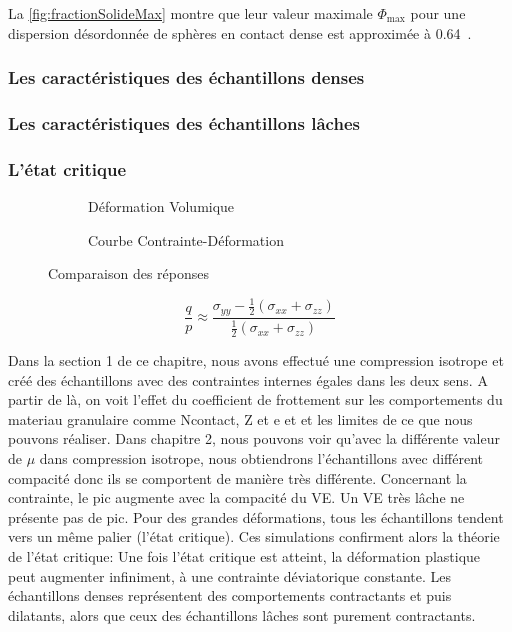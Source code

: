 \documentclass[a4paper,12pt]{report}
\begin{document}
La \autoref{fig:fractionSolideMax} montre que leur valeur maximale $\Phi_{\max}$ pour une dispersion désordonnée de sphères en contact dense est approximée à 0.64~\cite{combe2023demlecture}.
\subsubsection{Les caractéristiques des échantillons denses}
\subsubsection{Les caractéristiques des échantillons lâches}
\subsubsection{L'état critique}
\begin{figure}[htbp]
    \centering
    \begin{subfigure}[b]{0.49\textwidth}
        \centering \small
        \scalebox{0.5}{}
        \caption{Déformation Volumique}
        \label{fig:defvol}
    \end{subfigure}
    \hfill
    \begin{subfigure}[b]{0.49\textwidth}
        \centering \small
        \scalebox{0.5}{}
        \caption{Courbe Contrainte-Déformation}
        \label{fig:contrainte}
    \end{subfigure}
    \caption{Comparaison des réponses}
    \label{fig:comparaison}
\end{figure}

\begin{equation}
    \frac{q}{p} \approx \frac{\sigma_{yy} - \frac{1}{2} (\sigma_{xx} + \sigma_{zz})}{\frac{1}{2} (\sigma_{xx} + \sigma_{zz})}
\end{equation}

Dans la section 1 de ce chapitre, nous avons effectué une compression isotrope et créé des échantillons avec des contraintes internes égales dans les deux sens. A partir de là, on voit l'effet du coefficient de frottement sur les comportements du materiau granulaire comme Ncontact, Z et e et et les limites de ce que nous pouvons réaliser.
Dans chapitre 2, nous pouvons voir qu’avec la différente valeur de $\mu$ dans compression isotrope, nous obtiendrons l’échantillons avec différent compacité donc ils se comportent de manière très différente.
Concernant la contrainte, le pic augmente avec la compacité du VE. Un VE très lâche ne présente pas de pic. Pour des grandes déformations, tous les échantillons tendent vers un même palier (l’état critique).
Ces simulations confirment alors la théorie de l’état critique: Une fois l’état critique est atteint, la déformation plastique peut augmenter infiniment, à une contrainte déviatorique constante. Les échantillons denses représentent des comportements contractants et puis dilatants, alors que ceux des échantillons lâches sont purement contractants.
\end{document}
